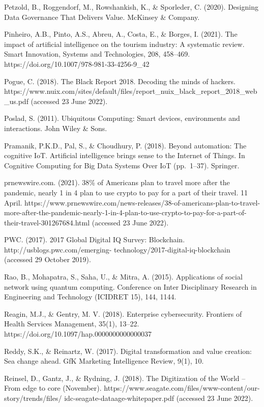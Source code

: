 \documentclass[
  letterpaper,
  DIV=11,
  numbers=noendperiod]{scrreprt}
\begin{document}
Petzold, B., Roggendorf, M., Rowshankish, K., \& Sporleder, C. (2020).
Designing Data Governance That Delivers Value. McKinsey \& Company.

Pinheiro, A.B., Pinto, A.S., Abreu, A., Costa, E., \& Borges, I. (2021).
The impact of artificial intelligence on the tourism industry: A
systematic review. Smart Innovation, Systems and Technologies, 208,
458--469. https://doi.org/10.1007/978-981-33-4256-9\_42

Pogue, C. (2018). The Black Report 2018. Decoding the minds of hackers.
https://www.nuix.com/sites/default/files/report\_nuix\_black\_report\_2018\_web\_us.pdf
(accessed 23 June 2022).

Poslad, S. (2011). Ubiquitous Computing: Smart devices, environments and
interactions. John Wiley \& Sons.

Pramanik, P.K.D., Pal, S., \& Choudhury, P. (2018). Beyond automation:
The cognitive IoT. Artificial intelligence brings sense to the Internet
of Things. In Cognitive Computing for Big Data Systems Over IoT
(pp.~1--37). Springer.

prnewswire.com. (2021). 38\% of Americans plan to travel more after the
pandemic, nearly 1 in 4 plan to use crypto to pay for a part of their
travel. 11 April.
https://www.prnewswire.com/news-releases/38-of-americans-plan-to-travel-more-after-the-pandemic-nearly-1-in-4-plan-to-use-crypto-to-pay-for-a-part-of-their-travel-301267684.html
(accessed 23 June 2022).

PWC. (2017). 2017 Global Digital IQ Survey: Blockchain.
http://usblogs.pwc.com/emerging- technology/2017-digital-iq-blockchain
(accessed 29 October 2019).

Rao, B., Mohapatra, S., Saha, U., \& Mitra, A. (2015). Applications of
social network using quantum computing. Conference on Inter Disciplinary
Research in Engineering and Technology (ICIDRET 15), 144, 1144.

Reagin, M.J., \& Gentry, M. V. (2018). Enterprise cybersecurity.
Frontiers of Health Services Management, 35(1), 13--22.
https://doi.org/10.1097/hap.0000000000000037

Reddy, S.K., \& Reinartz, W. (2017). Digital transformation and value
creation: Sea change ahead. GfK Marketing Intelligence Review, 9(1), 10.

Reinsel, D., Gantz, J., \& Rydning, J. (2018). The Digitization of the
World -- From edge to core (November).
https://www.seagate.com/files/www-content/our-story/trends/files/
idc-seagate-dataage-whitepaper.pdf (accessed 23 June 2022).
\end{document}
